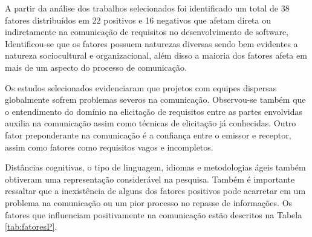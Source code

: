 A partir da análise dos trabalhos selecionados foi identificado um total de 38 fatores distribuídos em 22 positivos e 16 negativos que afetam direta ou indiretamente na comunicação de requisitos no desenvolvimento de software,  Identificou-se que os fatores possuem naturezas diversas sendo bem evidentes a natureza sociocultural e organizacional, além disso a maioria dos fatores afeta em mais de um aspecto do processo de comunicação.

Os estudos selecionados evidenciaram que projetos com equipes dispersas globalmente sofrem problemas severos na comunicação. Observou-se também que o entendimento do domínio na elicitação de requisitos entre as partes envolvidas auxilia na comunicação assim como técnicas de elicitação já conhecidas. Outro fator preponderante na comunicação é a confiança entre o emissor e receptor, assim como fatores como requisitos vagos e incompletos.

Distâncias cognitivas, o tipo de linguagem, idiomas e metodologias ágeis também obtiveram uma representação considerável na pesquisa. Também é importante ressaltar que a inexistência de alguns dos fatores positivos pode acarretar em um problema na comunicação ou um pior processo no repasse de informações. Os fatores que influenciam positivamente na comunicação estão descritos na Tabela \ref{tab:fatoresP}.


